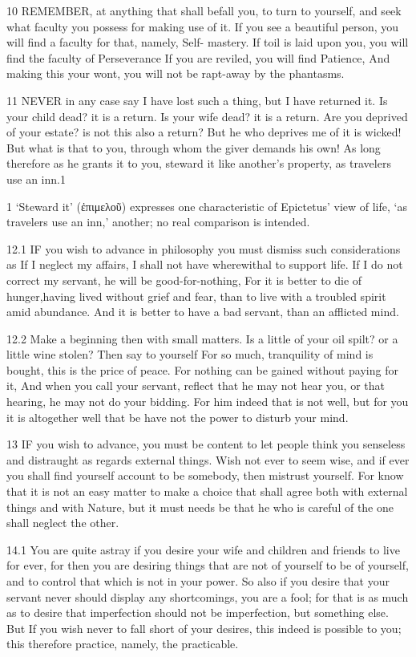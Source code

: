    10   REMEMBER, at anything that shall befall you, to turn to yourself, and seek what faculty you possess for making use of it.  If you see a beautiful person, you will find a faculty for that, namely, Self- mastery. If toil is laid upon you, you will find the faculty of Perseverance If you are reviled, you will find Patience, And making this your wont, you will not be rapt-away by the phantasms.

   11   NEVER in any case say I have lost such a thing, but I have returned it. Is your child dead? it is a return. Is your wife dead? it is a return.  Are you deprived of your estate? is not this also a return? But he who deprives me of it is wicked! But what is that to you, through whom the giver demands his own! As long therefore as he grants it to you, steward it like another’s property, as travelers use an inn.1

   1 ‘Steward it’ (ἐπιμελοῦ) expresses one characteristic of Epictetus’ view of life, ‘as travelers use an inn,’ another; no real comparison is intended.

   12.1   IF you wish to advance in philosophy you must dismiss such considerations as If I neglect my affairs, I shall not have wherewithal to support life. If I do not correct my servant, he will be good-for-nothing, For it is better to die of hunger,having lived without grief and fear, than to live with a troubled spirit amid abundance. And it is better to have a bad servant, than an afflicted mind.

   12.2   Make a beginning then with small matters. Is a little of your oil spilt? or a little wine stolen? Then say to yourself For so much, tranquility of mind is bought, this is the price of peace.  For nothing can be gained without paying for it, And when you call your servant, reflect that he may not hear you, or that hearing, he may not do your bidding. For him indeed that is not well, but for you it is altogether well that be have not the power to disturb your mind.

   13   IF you wish to advance, you must be content to let people think you senseless and distraught as regards external things.  Wish not ever to seem wise,  and if ever you shall find yourself account to be somebody, then mistrust yourself. For know that it is not an easy matter to make a choice that shall agree both with external things and with Nature, but it must needs be that he who is careful of the one shall neglect the other.

   14.1   You are quite astray if you desire your wife and children and friends to live for ever, for then you are desiring things that are not of yourself to be of yourself, and to control that which is not in your power.  So also if you desire that your servant never should display any shortcomings, you are a fool;  for that is as much as to desire that imperfection should not be imperfection, but something else. But If you wish never to fall short of your desires, this indeed is possible to you; this therefore practice, namely, the practicable.

